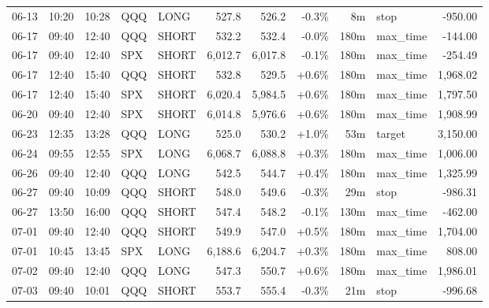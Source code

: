 \documentclass[11pt,a4paper,twoside]{article}
\begin{document}
\begin{center}
\begin{longtable}{>{\color{txtmain}}l l l l l r r r r >{\color{txtmain}}l r}
06-13 & 10:20 & 10:28 & QQQ & LONG & 527.8 & 526.2 & \textcolor{lossred}{-0.3\%} & 8m & stop & \textcolor{lossred}{-950.00} \\
06-17 & 09:40 & 12:40 & QQQ & SHORT & 532.2 & 532.4 & \textcolor{lossred}{-0.0\%} & 180m & max\_time & \textcolor{lossred}{-144.00} \\
06-17 & 09:40 & 12:40 & SPX & SHORT & 6,012.7 & 6,017.8 & \textcolor{lossred}{-0.1\%} & 180m & max\_time & \textcolor{lossred}{-254.49} \\
06-17 & 12:40 & 15:40 & QQQ & SHORT & 532.8 & 529.5 & \textcolor{wingreen}{+0.6\%} & 180m & max\_time & \textcolor{wingreen}{1,968.02} \\
06-17 & 12:40 & 15:40 & SPX & SHORT & 6,020.4 & 5,984.5 & \textcolor{wingreen}{+0.6\%} & 180m & max\_time & \textcolor{wingreen}{1,797.50} \\
06-20 & 09:40 & 12:40 & SPX & SHORT & 6,014.8 & 5,976.6 & \textcolor{wingreen}{+0.6\%} & 180m & max\_time & \textcolor{wingreen}{1,908.99} \\
06-23 & 12:35 & 13:28 & QQQ & LONG & 525.0 & 530.2 & \textcolor{wingreen}{+1.0\%} & 53m & target & \textcolor{wingreen}{3,150.00} \\
06-24 & 09:55 & 12:55 & SPX & LONG & 6,068.7 & 6,088.8 & \textcolor{wingreen}{+0.3\%} & 180m & max\_time & \textcolor{wingreen}{1,006.00} \\
06-26 & 09:40 & 12:40 & QQQ & LONG & 542.5 & 544.7 & \textcolor{wingreen}{+0.4\%} & 180m & max\_time & \textcolor{wingreen}{1,325.99} \\
06-27 & 09:40 & 10:09 & QQQ & SHORT & 548.0 & 549.6 & \textcolor{lossred}{-0.3\%} & 29m & stop & \textcolor{lossred}{-986.31} \\
06-27 & 13:50 & 16:00 & QQQ & SHORT & 547.4 & 548.2 & \textcolor{lossred}{-0.1\%} & 130m & max\_time & \textcolor{lossred}{-462.00} \\
07-01 & 09:40 & 12:40 & QQQ & SHORT & 549.9 & 547.0 & \textcolor{wingreen}{+0.5\%} & 180m & max\_time & \textcolor{wingreen}{1,704.00} \\
07-01 & 10:45 & 13:45 & SPX & LONG & 6,188.6 & 6,204.7 & \textcolor{wingreen}{+0.3\%} & 180m & max\_time & \textcolor{wingreen}{808.00} \\
07-02 & 09:40 & 12:40 & QQQ & LONG & 547.3 & 550.7 & \textcolor{wingreen}{+0.6\%} & 180m & max\_time & \textcolor{wingreen}{1,986.01} \\
07-03 & 09:40 & 10:01 & QQQ & SHORT & 553.7 & 555.4 & \textcolor{lossred}{-0.3\%} & 21m & stop & \textcolor{lossred}{-996.68} \\

\end{longtable}
\end{center}
\end{document}
